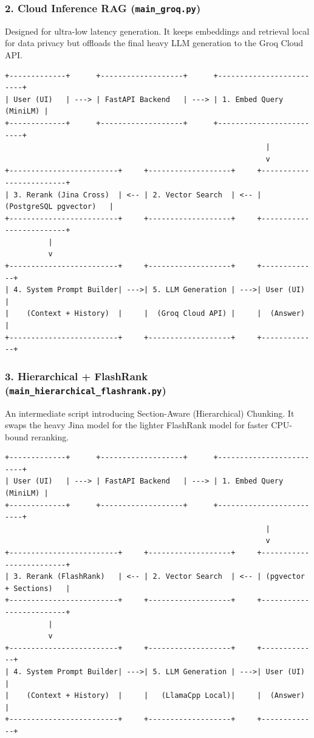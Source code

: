 \documentclass[11pt, a4paper]{article}
\begin{document}
\subsubsection{2. Cloud Inference RAG (\texttt{main\_groq.py})}
Designed for ultra-low latency generation. It keeps embeddings and retrieval local for data privacy but offloads the final heavy LLM generation to the Groq Cloud API.

\begin{verbatim}
+-------------+      +-------------------+      +-------------------------+
| User (UI)   | ---> | FastAPI Backend   | ---> | 1. Embed Query (MiniLM) |
+-------------+      +-------------------+      +-------------------------+
                                                            |
                                                            v
+-------------------------+     +-------------------+     +-------------------------+
| 3. Rerank (Jina Cross)  | <-- | 2. Vector Search  | <-- | (PostgreSQL pgvector)   |
+-------------------------+     +-------------------+     +-------------------------+
          |
          v
+-------------------------+     +-------------------+     +-------------+
| 4. System Prompt Builder| --->| 5. LLM Generation | --->| User (UI)   |
|    (Context + History)  |     |  (Groq Cloud API) |     |  (Answer)   |
+-------------------------+     +-------------------+     +-------------+
\end{verbatim}

\subsubsection{3. Hierarchical + FlashRank (\texttt{main\_hierarchical\_flashrank.py})}
An intermediate script introducing Section-Aware (Hierarchical) Chunking. It swaps the heavy Jina model for the lighter FlashRank model for faster CPU-bound reranking.

\begin{verbatim}
+-------------+      +-------------------+      +-------------------------+
| User (UI)   | ---> | FastAPI Backend   | ---> | 1. Embed Query (MiniLM) |
+-------------+      +-------------------+      +-------------------------+
                                                            |
                                                            v
+-------------------------+     +-------------------+     +-------------------------+
| 3. Rerank (FlashRank)   | <-- | 2. Vector Search  | <-- | (pgvector + Sections)   |
+-------------------------+     +-------------------+     +-------------------------+
          |
          v
+-------------------------+     +-------------------+     +-------------+
| 4. System Prompt Builder| --->| 5. LLM Generation | --->| User (UI)   |
|    (Context + History)  |     |   (LlamaCpp Local)|     |  (Answer)   |
+-------------------------+     +-------------------+     +-------------+
\end{verbatim}
\end{document}
